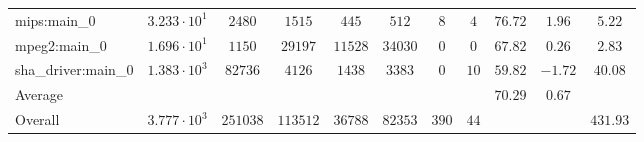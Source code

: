 \begin{tabular}{|l|c|c|c|c|c|c|c|c|c|c|}
mips:main\_0            & $ 3.233 \cdot 10^{1} $ & $ 2480   $ & $ 1515   $ & $ 445   $ & $ 512   $ & $ 8   $ & $ 4  $ & $ 76.72       $ & $ 1.96    $ & $ 5.22    $ \\
mpeg2:main\_0           & $ 1.696 \cdot 10^{1} $ & $ 1150   $ & $ 29197  $ & $ 11528 $ & $ 34030 $ & $ 0   $ & $ 0  $ & $ 67.82       $ & $ 0.26    $ & $ 2.83    $ \\
sha\_driver:main\_0     & $ 1.383 \cdot 10^{3} $ & $ 82736  $ & $ 4126   $ & $ 1438  $ & $ 3383  $ & $ 0   $ & $ 10 $ & $ 59.82       $ & $ -1.72   $ & $ 40.08   $ \\
\hline
Average                 & $                    $ & $        $ & $        $ & $       $ & $       $ & $     $ & $    $ & $ 70.29       $ & $ 0.67    $ & $         $ \\
\hline
Overall                 & $ 3.777 \cdot 10^{3} $ & $ 251038 $ & $ 113512 $ & $ 36788 $ & $ 82353 $ & $ 390 $ & $ 44 $ & $             $ & $         $ & $ 431.93  $ \\
\hline
\end{tabular}

